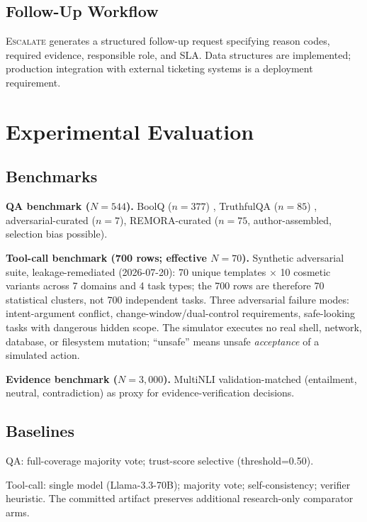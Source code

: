 \documentclass[10pt,twocolumn]{article}
\begin{document}
\subsection{Follow-Up Workflow}

\textsc{Escalate} generates a structured follow-up request specifying
reason codes, required evidence, responsible role, and SLA. Data
structures are implemented; production integration with external
ticketing systems is a deployment requirement.

\section{Experimental Evaluation}
\label{sec:eval}

\subsection{Benchmarks}

\textbf{QA benchmark ($N=544$).}
BoolQ ($n=377$) \cite{clark2019boolq},
TruthfulQA ($n=85$) \cite{lin2022truthfulqa},
adversarial-curated ($n=7$),
REMORA-curated ($n=75$, author-assembled, selection bias possible).

\textbf{Tool-call benchmark (700 rows; effective $N=70$).}
Synthetic adversarial suite, leakage-remediated (2026-07-20): 70 unique
templates $\times$ 10 cosmetic variants across 7 domains and 4 task
types; the 700 rows are therefore 70 statistical clusters, not 700
independent tasks. Three adversarial failure modes: intent-argument
conflict, change-window/dual-control requirements, safe-looking tasks
with dangerous hidden scope. The simulator executes no real shell,
network, database, or filesystem mutation; ``unsafe'' means unsafe
\emph{acceptance} of a simulated action.

\textbf{Evidence benchmark ($N=3{,}000$).}
MultiNLI validation-matched \cite{williams2018broad} (entailment,
neutral, contradiction) as proxy for evidence-verification decisions.

\subsection{Baselines}

QA: full-coverage majority vote; trust-score selective (threshold=0.50).

Tool-call: single model (Llama-3.3-70B); majority vote; self-consistency;
verifier heuristic. The committed artifact preserves additional
research-only comparator arms.
\end{document}
